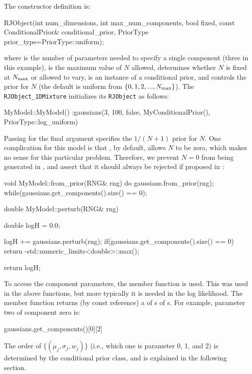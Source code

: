 \documentclass[article, nojss]{jss}
\begin{document}
The  constructor definition is:
\begin{CodeChunk}
\begin{CodeInput}
RJObject(int num_dimensions, int max_num_components, bool fixed,
         const ConditionalPrior& conditional_prior,
         PriorType prior_type=PriorType::uniform);
\end{CodeInput}
\end{CodeChunk}
where  is the number of parameters needed to
specify a single component (three in this example), 
is the maximum value of $N$ allowed,  determines whether
$N$ is fixed at $N_{\rm max}$ or allowed to vary,
 is an instance of a conditional prior,
and  controls the prior for $N$ (the default is uniform
from $\{0, 1, 2, ..., N_{\rm max}\}$). The {\tt RJObject\_1DMixture}
 initializes its {\tt RJObject} as follows:
\begin{CodeChunk}
\begin{CodeInput}
MyModel::MyModel()
:gaussians(3, 100, false, MyConditionalPrior(), PriorType::log_uniform)
{
}
\end{CodeInput}
\end{CodeChunk}
Passing  for the final argument
specifies the $1/(N+1)$ prior for $N$.
One complication for this model is that , by default,
allows $N$ to be zero, which makes no sense for this particular
problem. Therefore, we prevent $N=0$ from being generated in
, and assert that it should always be
rejected if proposed in :

\begin{CodeChunk}
\begin{CodeInput}
void MyModel::from_prior(RNG& rng)
{
    do
    {
        gaussians.from_prior(rng);
    }while(gaussians.get_components().size() == 0);
}

double MyModel::perturb(RNG& rng)
{
    double logH = 0.0;

    logH += gaussians.perturb(rng);
    if(gaussians.get_components().size() == 0)
        return -std::numeric_limits<double>::max();

    return logH;
}
\end{CodeInput}
\end{CodeChunk}

To access the component parameters, the  member function
 is used. This was used in the above functions, but more
typically it is needed in the log likelihood.
The member function  returns (by const reference) a
 of s of s. For example,
parameter two of component zero is:
\begin{CodeChunk}
\begin{CodeInput}
gaussians.get_components()[0][2]
\end{CodeInput}
\end{CodeChunk}
The order of $\{(\mu_j, \sigma_j, w_j)\}$
(i.e., which one is parameter 0, 1, and 2)
is determined by the conditional prior class, and is
explained in the following section.
\end{document}
